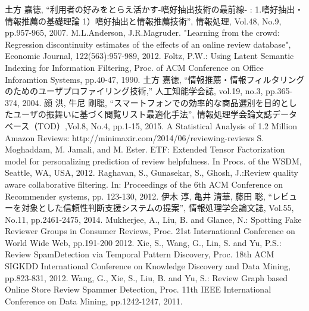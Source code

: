 \documentclass[a4paper,11pt,oneside,openany]{jsbook}
\begin{document}
\begin{thebibliography}{99}
	土方 嘉徳, “利用者の好みをとらえ活かす-嗜好抽出技術の最前線- : 1.嗜好抽出・情報推薦の基礎理論 1）嗜好抽出と情報推薦技術”, 情報処理, Vol.48, No.9, pp.957-965, 2007.
	M.L.Anderson, J.R.Magruder. "Learning from the crowd: Regression discontinuity estimates of the effects of an online review database", Economic Journal, 122(563):957-989, 2012.
	Foltz, P.W.: Using Latent Semantic Indexing for Information Filtering, Proc. of ACM Conference on Office Inforamtion Systems, pp.40-47, 1990.
	土方 嘉徳, “情報推薦・情報フィルタリングのためのユーザプロファイリング技術,” 人工知能学会誌, vol.19, no.3, pp.365-374, 2004.
	顔 洪, 牛尼 剛聡, “スマートフォンでの効率的な商品選別を目的としたユーザの振舞いに基づく閲覧リスト最適化手法”, 情報処理学会論文誌データベース（TOD）,Vol.8, No.4, pp.1-15, 2015.
	A Statistical Analysis of 1.2 Million Amazon Reviews: http://minimaxir.com/2014/06/reviewing-reviews
        S. Moghaddam, M. Jamali, and M. Ester. ETF: Extended Tensor Factorization model for personalizing prediction of review helpfulness. In Procs. of the WSDM, Seattle, WA, USA, 2012. 
	Raghavan, S., Gunasekar, S., Ghosh, J.:Review quality aware collaborative filtering. In: Proceedings of the 6th ACM Conference on Recommender systems, pp. 123-130, 2012.
	伊木 淳, 亀井 清華, 藤田 聡, “レビューを対象とした信頼性判断支援システムの提案”, 情報処理学会論文誌, Vol.55, No.11, pp.2461-2475, 2014.
	Mukherjee, A., Liu, B. and Glance, N.: Spotting Fake Reviewer Groups in Consumer Reviews, Proc. 21st International Conference on World Wide Web, pp.191-200 2012.
	Xie, S., Wang, G., Lin, S. and Yu, P.S.: Review SpamDetection via Temporal Pattern Discovery, Proc. 18th ACM SIGKDD International Conference on Knowledge Discovery and Data Mining, pp.823-831, 2012.
	Wang, G., Xie, S., Liu, B. and Yu, S.: Review Graph based Online Store Review Spammer Detection, Proc. 11th IEEE International Conference on Data Mining, pp.1242-1247, 2011.
	
	

\end{thebibliography}
\end{document}
